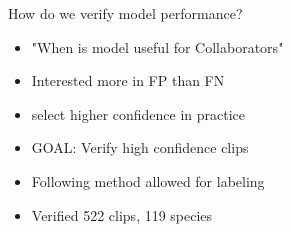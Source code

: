 





\begin{frame}{How do we verify model performance?}
    \begin{itemize}
        \item "When is model useful for Collaborators"
        \item Interested more in FP than FN
        \item select higher confidence in practice
        \item GOAL: Verify high confidence clips
        \item Following method allowed for labeling
        \item Verified 522 clips, 119 species
    \end{itemize}
\end{frame}


